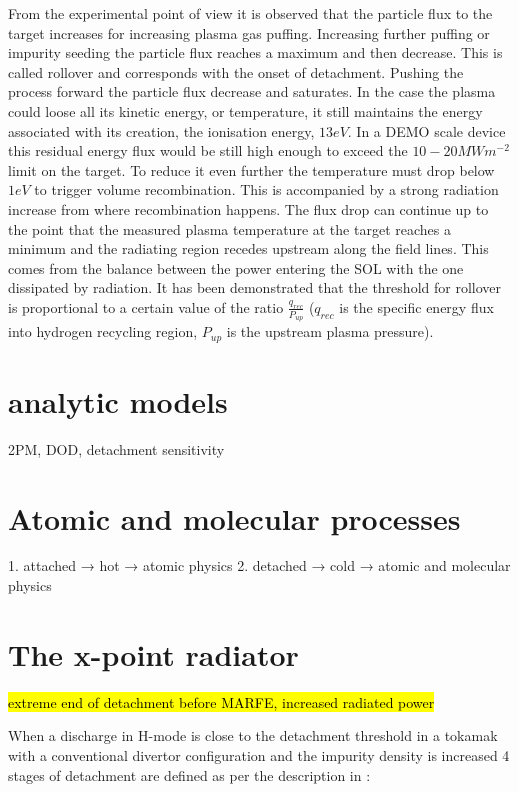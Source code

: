 From the experimental point of view it is observed that the particle flux to the target increases for increasing plasma gas puffing. Increasing further puffing or impurity seeding the particle flux reaches a maximum and then decrease. This is called rollover and corresponds with the onset of detachment. Pushing the process forward the particle flux decrease and saturates. In the case the plasma could loose all its kinetic energy, or temperature, it still maintains the energy associated with its creation, the ionisation energy, $13eV$. In a DEMO scale device this residual energy flux would be still high enough to exceed the $10-20 MWm^{-2}$ limit on the target. \cite{Krasheninnikov2017a} To reduce it even further the temperature must drop below $1eV$ to trigger volume recombination. This is accompanied by a strong radiation increase from where recombination happens. The flux drop can continue up to the point that the measured plasma temperature at the target reaches a minimum and the radiating region recedes upstream along the field lines. This comes from the balance between the power entering the SOL with the one dissipated by radiation. It has been demonstrated that the threshold for rollover is proportional to a certain value of the ratio $ \frac {q_{rec}} {P_{up}}$ ($q_{rec}$ is the speciﬁc energy ﬂux into hydrogen recycling region, $P_{up}$ is the upstream plasma pressure). \cite{Krasheninnikov1999}\cite{Krasheninnikov2016}


\section{analytic models}
2PM, DOD, detachment sensitivity
\section{Atomic and molecular processes}
            1. attached → hot → atomic physics
            2. detached → cold → atomic and molecular physics
\section{The x-point radiator}
\hl{extreme end of detachment before MARFE, increased radiated power}

When a discharge in H-mode is close to the detachment threshold in a tokamak with a conventional divertor configuration and the impurity density is increased 4 stages of detachment are defined as per the description in \cite{Reimold2015}:

